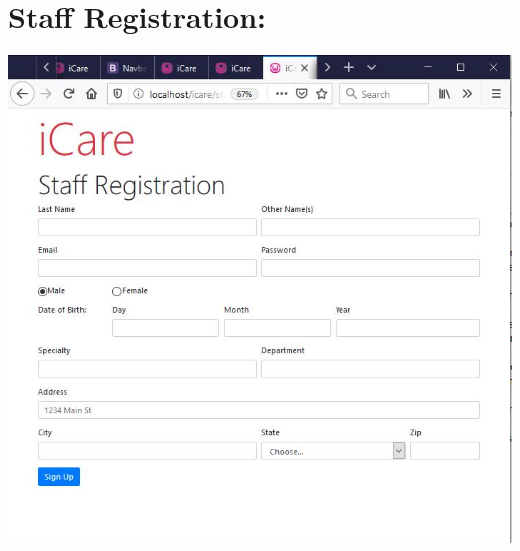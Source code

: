 \documentclass[a4paper,12pt]{report}
\begin{document}
\section*{Staff Registration:}
\includegraphics[scale=0.8]{Implementation/staffRegistration.JPG}
\end{document}
